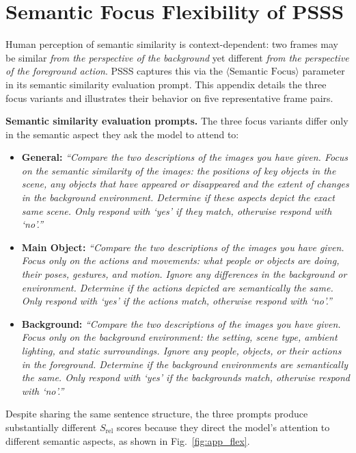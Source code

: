 \documentclass[10pt,journal]{IEEEtran}
\begin{document}
\section{Semantic Focus Flexibility of PSSS}
\label{appendix:semantic_focus}

Human perception of semantic similarity is context-dependent: two frames may be similar \emph{from the perspective of the background} yet different \emph{from the perspective of the foreground action}. PSSS captures this via the $\langle\text{Semantic Focus}\rangle$ parameter in its semantic similarity evaluation prompt. This appendix details the three focus variants and illustrates their behavior on five representative frame pairs.

\textbf{Semantic similarity evaluation prompts.}
The three focus variants differ only in the semantic aspect they ask the model to attend to:
\begin{itemize}
  \item \textbf{General:} \emph{``Compare the two descriptions of the images you have given. Focus on the semantic similarity of the images: the positions of key objects in the scene, any objects that have appeared or disappeared and the extent of changes in the background environment. Determine if these aspects depict the exact same scene. Only respond with `yes' if they match, otherwise respond with `no'.''}

  \item \textbf{Main Object:} \emph{``Compare the two descriptions of the images you have given. Focus only on the actions and movements: what people or objects are doing, their poses, gestures, and motion. Ignore any differences in the background or environment. Determine if the actions depicted are semantically the same. Only respond with `yes' if the actions match, otherwise respond with `no'.''}

  \item \textbf{Background:} \emph{``Compare the two descriptions of the images you have given. Focus only on the background environment: the setting, scene type, ambient lighting, and static surroundings. Ignore any people, objects, or their actions in the foreground. Determine if the background environments are semantically the same. Only respond with `yes' if the backgrounds match, otherwise respond with `no'.''}
\end{itemize}

Despite sharing the same sentence structure, the three prompts produce substantially different $S_\mathrm{rel}$ scores because they direct the model's attention to different semantic aspects, as shown in Fig.~\ref{fig:app_flex}.
\end{document}
